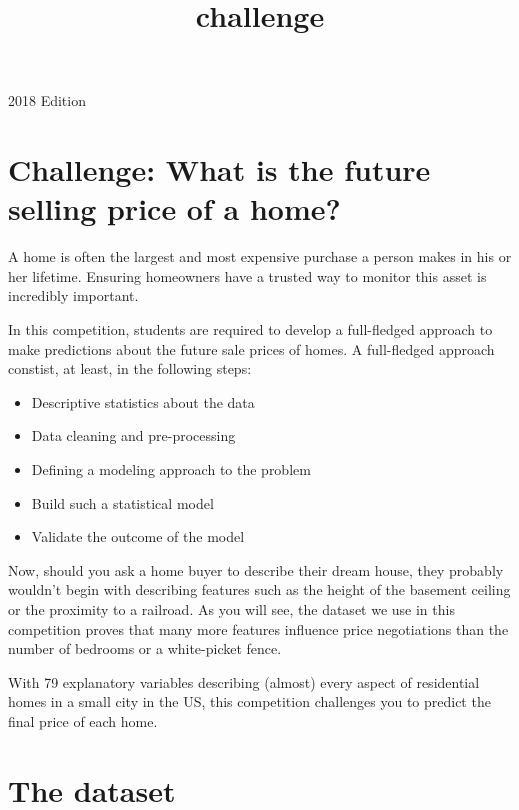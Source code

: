 \documentclass[11pt]{article}
\title{challenge}
\providecommand{\tightlist}{%
      \setlength{\itemsep}{0pt}\setlength{\parskip}{0pt}}
\begin{document}
    
    
    \maketitle
    
    

    
    2018 Edition

    \section{Challenge: What is the future selling price of a
home?}\label{challenge-what-is-the-future-selling-price-of-a-home}

A home is often the largest and most expensive purchase a person makes
in his or her lifetime. Ensuring homeowners have a trusted way to
monitor this asset is incredibly important.

In this competition, students are required to develop a full-fledged
approach to make predictions about the future sale prices of homes. A
full-fledged approach constist, at least, in the following steps:

\begin{itemize}
\tightlist
\item
  Descriptive statistics about the data
\item
  Data cleaning and pre-processing
\item
  Defining a modeling approach to the problem
\item
  Build such a statistical model
\item
  Validate the outcome of the model
\end{itemize}

Now, should you ask a home buyer to describe their dream house, they
probably wouldn't begin with describing features such as the height of
the basement ceiling or the proximity to a railroad. As you will see,
the dataset we use in this competition proves that many more features
influence price negotiations than the number of bedrooms or a
white-picket fence.

With 79 explanatory variables describing (almost) every aspect of
residential homes in a small city in the US, this competition challenges
you to predict the final price of each home.

    \section{The dataset}\label{the-dataset}
\end{document}
